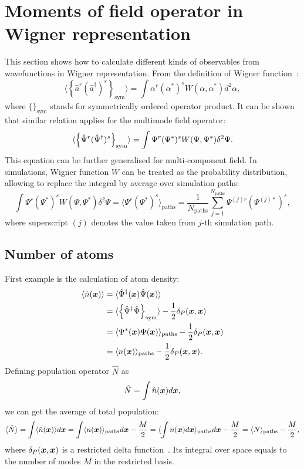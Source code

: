 \chapter{Moments of field operator in Wigner representation}
\label{cha:appendix:moments-calculation}

\newcommand{\symprod}[1]{\left\{ #1 \right\}_{\mathrm{sym}}}
\newcommand{\pathavg}[1]{\langle #1 \rangle_{\mathrm{paths}}}
\newcommand{\Real}{\mathrm{Re}}
\newcommand{\Imag}{\mathrm{Im}}


This section shows how to calculate different kinds of observables from wavefunctions in Wigner representation.
From the definition of Wigner function~\cite{Gardiner2004}:
\[
	\langle \symprod{ \hat{a}^r ( \hat{a}^\dagger)^s } \rangle
	= \int \alpha^r (\alpha^*)^s W (\alpha, \alpha^*) d^2\alpha ,
\]
where $\{\}_{\mathrm{sym}}$ stands for symmetrically ordered operator product.
It can be shown that similar relation applies for the multimode field operator:
\[
	\langle \symprod{ \Psiop^r ( \Psiop^\dagger)^s } \rangle
	= \int \Psi^r (\Psi^*)^s W (\Psi, \Psi^*) \delta^2\Psi.
\]
This equation can be further generalised for multi-component field.
In simulations, Wigner function $W$ can be treated as the probability distribution, allowing to replace the integral by average over simulation paths:
\[
	\int \Psi^r (\Psi^*)^s W (\Psi, \Psi^*) \delta^2\Psi
	= \pathavg{ \Psi^r (\Psi^*)^s }
	= \frac{1}{N_{\mathrm{paths}}} \sum\limits_{j=1}^{N_{\mathrm{paths}}}
		\Psi^{(j)r} (\Psi^{(j)*})^s,
\]
where superscript $(j)$ denotes the value taken from $j$-th simulation path.


\section{Number of atoms}

First example is the calculation of atom density:
\begin{equation*}
\begin{split}
		\langle \hat{n} (\xvec) \rangle
		& = \langle \Psiop^\dagger (\xvec) \Psiop (\xvec) \rangle \\
		& = \langle
				\symprod{ \Psiop^\dagger \Psiop }
			\rangle - \frac{1}{2} \delta_P (\xvec, \xvec) \\
		& = \pathavg{ \Psi^* (\xvec) \Psi (\xvec) }
			- \frac{1}{2} \delta_P (\xvec, \xvec) \\
		& = \pathavg{ n (\xvec) }
			- \frac{1}{2} \delta_P (\xvec, \xvec).
\end{split}
\end{equation*}
Defining population operator $\hat{N}$ as
\[
	\hat{N} = \int \hat{n} (\boldsymbol{x}) d\boldsymbol{x},
\]
we can get the average of total population:
\[
		\langle \hat{N} \rangle
		= \int \langle \hat{n}(\xvec) \rangle d\xvec
		= \int \pathavg{ n(\xvec) } d\xvec - \frac{M}{2}
		= \pathavg{ \int n(\xvec) d\xvec } d\xvec - \frac{M}{2}
		= \pathavg{N} - \frac{M}{2},
\]
where $\delta_P (\boldsymbol{x}, \boldsymbol{x})$ is a restricted delta function~.
Its integral over space equals to the number of modes $M$ in the restricted basis.

